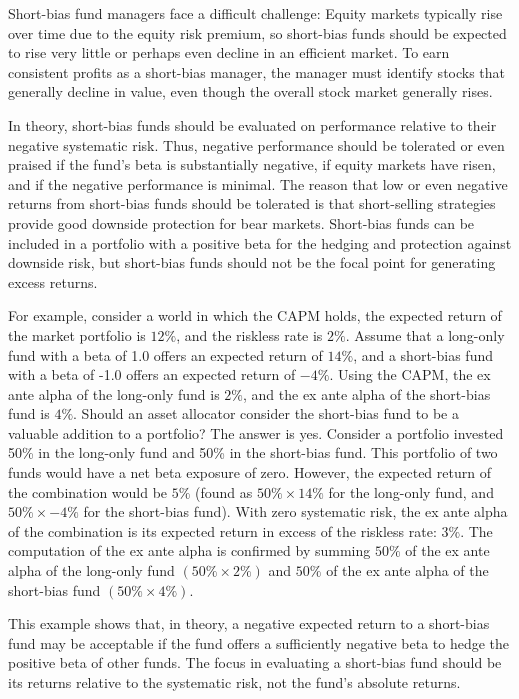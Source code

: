 \documentclass[11pt]{article}
\begin{document}
Short-bias fund managers face a difficult challenge: Equity markets typically rise over time due to the equity risk premium, so short-bias funds should be expected to rise very little or perhaps even decline in an efficient market. To earn consistent profits as a short-bias manager, the manager must identify stocks that generally decline in value, even though the overall stock market generally rises.

In theory, short-bias funds should be evaluated on performance relative to their negative systematic risk. Thus, negative performance should be tolerated or even praised if the fund's beta is substantially negative, if equity markets have risen, and if the negative performance is minimal. The reason that low or even negative returns from short-bias funds should be tolerated is that short-selling strategies provide good downside protection for bear markets. Short-bias funds can be included in a portfolio with a positive beta for the hedging and protection against downside risk, but short-bias funds should not be the focal point for generating excess returns.

For example, consider a world in which the CAPM holds, the expected return of the market portfolio is $12 \%$, and the riskless rate is $2 \%$. Assume that a long-only fund with a beta of 1.0 offers an expected return of $14 \%$, and a short-bias fund with a beta of -1.0 offers an expected return of $-4 \%$. Using the CAPM, the ex ante alpha of the long-only fund is $2 \%$, and the ex ante alpha of the short-bias fund is $4 \%$. Should an asset allocator consider the short-bias fund to be a valuable addition to a portfolio? The answer is yes. Consider a portfolio invested 50\% in the long-only fund and 50\% in the short-bias fund. This portfolio of two funds would have a net beta exposure of zero. However, the expected return of the combination would be $5 \%$ (found as $50 \% \times 14 \%$ for the long-only fund, and $50 \% \times-4 \%$ for the short-bias fund). With zero systematic risk, the ex ante alpha of the combination is its expected return in excess of the riskless rate: $3 \%$. The computation of the ex ante alpha is confirmed by summing $50 \%$ of the ex ante alpha of the long-only fund $(50 \% \times 2 \%)$ and $50 \%$ of the ex ante alpha of the short-bias fund $(50 \% \times 4 \%)$.

This example shows that, in theory, a negative expected return to a short-bias fund may be acceptable if the fund offers a sufficiently negative beta to hedge the positive beta of other funds. The focus in evaluating a short-bias fund should be its returns relative to the systematic risk, not the fund's absolute returns.
\end{document}
